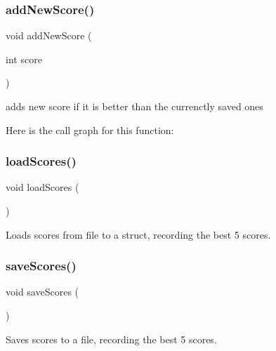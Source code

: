 \subsubsection{\texorpdfstring{addNewScore()}{addNewScore()}}
{\footnotesize\ttfamily void add\+New\+Score (\begin{DoxyParamCaption}\item[{int}]{score }\end{DoxyParamCaption})}



adds new score if it is better than the currenctly saved ones 

Here is the call graph for this function\+:
\mbox{\label{group__score_ga1d81d36cfc183a1a1c8524facb3497aa}} 
\subsubsection{\texorpdfstring{loadScores()}{loadScores()}}
{\footnotesize\ttfamily void load\+Scores (\begin{DoxyParamCaption}{ }\end{DoxyParamCaption})}



Loads scores from file to a struct, recording the best 5 scores. 

\mbox{\label{group__score_ga857943eead55a1059d11f95f7f1c936b}} 
\subsubsection{\texorpdfstring{saveScores()}{saveScores()}}
{\footnotesize\ttfamily void save\+Scores (\begin{DoxyParamCaption}{ }\end{DoxyParamCaption})}



Saves scores to a file, recording the best 5 scores. 

